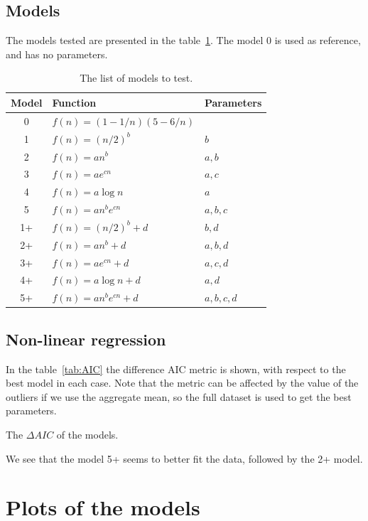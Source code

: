 \documentclass[a4paper]{article}
\begin{document}
\subsection{Models}

The models tested are presented in the table~\ref{tab:models}. The model 0 is 
used as reference, and has no parameters.
%
\begin{table}[h]
	\centering
	\begin{tabular}{cll}
		\toprule
		Model & Function & Parameters\\
		\midrule
		0  & $f(n) = (1-1/n)(5-6/n)$	& \\
		1  & $f(n) = (n/2)^b$					& $b$ \\
		2  & $f(n) = an^b$ 						& $a,b$\\
		3  & $f(n) = ae^{cn}$					& $a,c$\\
		4  & $f(n) = a\log n$					& $a$\\
		5  & $f(n) = an^be^{cn}$			& $a,b,c$\\
		1+ & $f(n) = (n/2)^b + d$			& $b,d$\\
		2+ & $f(n) = an^b + d$				& $a,b,d$\\
		3+ & $f(n) = ae^{cn} + d$			& $a,c,d$\\
		4+ & $f(n) = a\log n + d$			& $a,d$\\
		5+ & $f(n) = an^be^{cn} + d$	& $a,b,c,d$\\
		\bottomrule
	\end{tabular}
	\caption{The list of models to test.}
	\label{tab:models}
\end{table}
%

\subsection{Non-linear regression}
%
In the table~\ref{tab:AIC} the difference AIC metric is shown, with respect to 
the best model in each case. Note that the metric can be affected by the value 
of the outliers if we use the aggregate mean, so the full dataset is used to get 
the best parameters.
%
\begin{table}[H]
	\centering
	
	
	\caption{The $\Delta AIC$ of the models.}
	\label{tab:AIC}
\end{table}
%
We see that the model 5+ seems to better fit the data, followed by the 2+ model.

\section{Plots of the models}
\end{document}
